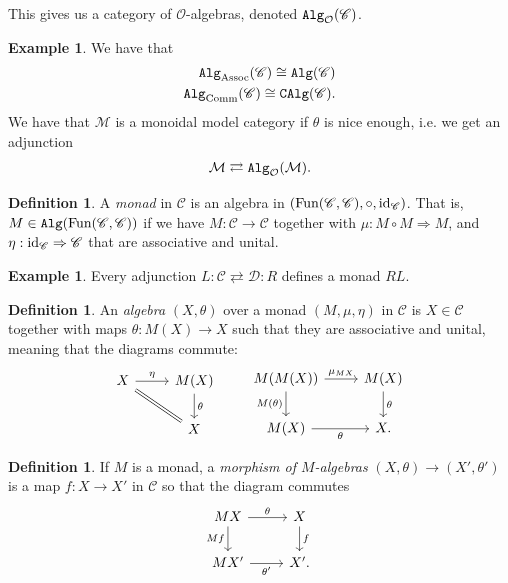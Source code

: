 \documentclass[12pt]{amsart}
\theoremstyle{definition}
\newtheorem{definition}[theorem]{Definition}
\newtheorem{example}[theorem]{Example}
\renewcommand{\O}{\mathcal{O}}
\providecommand{\Assoc}{\text{Assoc}}
\providecommand{\Comm}{\text{Comm}}
\begin{document}
This gives us a category of $\O$-algebras, denoted $\Alg_\O(\mathscr{C})$.

\begin{example} We have that
\begin{align*}
    \Alg_\Assoc(\mathscr{C}) \cong \Alg(\mathscr{C}) \\
    \Alg_\Comm(\mathscr{C}) \cong \CAlg(\mathscr{C}).
\end{align*}
We have that $\mathcal{M}$ is a monoidal model category if $\theta$ is nice enough, i.e. we get an adjunction
\begin{align*}
    \mathcal{M} \rightleftarrows \Alg_\O(\mathcal{M}).
\end{align*}
\end{example}

\begin{definition} A \textit{monad} in $\mathscr{C}$ is an algebra in $\left( \text{Fun}(\mathscr{C},\mathscr{C}), \circ, \text{id}_\mathscr{C} \right)$. That is, $M \in \texttt{Alg}(\text{Fun}(\mathscr{C},\mathscr{C}))$ if we have $M: \mathscr{C} \to \mathscr{C}$ together with $\mu: M\circ M \Rightarrow M$, and $\eta: \text{id}_\mathscr{C} \Rightarrow \mathscr{C}$ that are associative and unital.
\end{definition}

\begin{example} Every adjunction $L : \mathscr{C} \rightleftarrows \mathscr{D}: R$ defines a monad $RL$.
\end{example}

\begin{definition} An \textit{algebra} $(X,\theta)$ over a monad $(M,\mu,\eta)$ in $\mathscr{C}$ is $X\in \mathscr{C}$ together with maps $\theta : M(X) \to X$ such that they are associative and unital, meaning that the diagrams commute:
\[ \begin{tikzcd}
    X\rar["\eta"]\ar[dr,equal] & M(X)\dar["\theta" right]\\
     & X
\end{tikzcd} \quad\quad \begin{tikzcd}
    M(M(X))\rar["\mu_{MX}"]\dar["M(\theta)" left] & M(X)\dar["\theta"]\\
    M(X)\rar["\theta" below] & X.
\end{tikzcd} \]
\end{definition}

\begin{definition} If $M$ is a monad, a \textit{morphism of $M$-algebras} $(X,\theta) \to (X',\theta')$ is a map $f:X\to X'$ in $\mathscr{C}$ so that the diagram commutes
\[ \begin{tikzcd}
    MX\rar["\theta"]\dar["Mf" left] & X\dar["f" right]\\
    MX'\rar["\theta'" below] & X'.
\end{tikzcd} \]
\end{definition}
\end{document}
